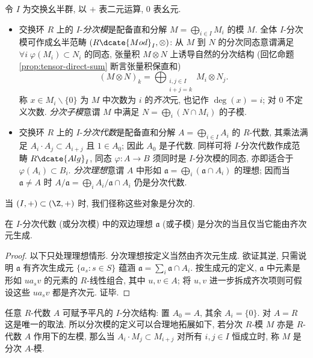 \begin{definition}[分次模与分次代数]\label{def:graded-module-alg}
	令 $I$ 为交换幺半群, 以 $+$ 表二元运算, $0$ 表幺元.
	\begin{itemize}
		\item 交换环 $R$ 上的 $I$-\emph{分次模}是配备直和分解 $M = \bigoplus_{i \in I} M_i$ 的模 $M$. 全体 $I$-分次模可作成幺半范畴 $(R\dcate{Mod}_I, \otimes)$: 从 $M$ 到 $N$ 的分次同态意谓满足 $\forall i \; \varphi(M_i) \subset N_i$ 的同态, 张量积 $M \otimes N$ 上诱导自然的分次结构 (回忆命题 \ref{prop:tensor-direct-sum} 断言张量积保直和)
		\[ (M \otimes N)_k = \bigoplus_{\substack{i,j \in I \\ i+j=k}} M_i \otimes N_j. \]
		称 $x \in M_i \smallsetminus \{0\}$ 为 $M$ 中次数为 $i$ 的\emph{齐次}元, 也记作 $\deg(x)=i$; 对 $0$ 不定义次数. \emph{分次子模}意谓 $M$ 中满足 $N = \bigoplus_i (N \cap M_i)$ 的子模.
		\item 交换环 $R$ 上的 $I$-\emph{分次代数}是配备直和分解 $A = \bigoplus_{i \in I} A_i$ 的 $R$-代数, 其乘法满足 $A_i \cdot A_j \subset A_{i+j}$ 且 $1 \in A_0$; 因此 $A_0$ 是子代数. 同样可将 $I$-分次代数作成范畴 $R\dcate{Alg}_I$, 同态 $\varphi: A \to B$ 须同时是 $I$-分次模的同态, 亦即适合于 $\varphi(A_i) \subset B_i$. \emph{分次理想}意谓 $A$ 中形如 $\mathfrak{a} = \bigoplus _i (\mathfrak{a} \cap A_i)$ 的理想; 因而当 $\mathfrak{a} \neq A$ 时 $A/\mathfrak{a} = \bigoplus_i A_i/\mathfrak{a} \cap A_i$ 仍是分次代数.
	\end{itemize}
	当 $(I,+) \subset (\Z,+)$ 时, 我们径称这些对象是分次的.
\end{definition}

\begin{lemma}\label{prop:graded-ideal-submodule}
	在 $I$-分次代数 (或分次模) 中的双边理想 $\mathfrak{a}$ (或子模) 是分次的当且仅当它能由齐次元生成.
\end{lemma}
\begin{proof}
	以下只处理理想情形. 分次理想按定义当然由齐次元生成. 欲证其逆, 只需说明 $\mathfrak{a}$ 有齐次生成元 $\{a_s : s \in S \}$ 蕴涵 $\mathfrak{a} = \sum_i \mathfrak{a} \cap A_i$. 按生成元的定义, $\mathfrak{a}$ 中元素是形如 $u a_s v$ 的元素的 $R$-线性组合, 其中 $u,v \in A$; 将 $u, v$ 进一步拆成齐次项则可假设这些 $u a_s v$ 都是齐次元. 证毕.
\end{proof}

任意 $R$-代数 $A$ 可赋予平凡的 $I$-分次结构: 置 $A_0 = A$, 其余 $A_i = \{0\}$. 对 $A = R$ 这是唯一的取法. 所以分次模的定义可以合理地拓展如下, 若分次 $R$-模 $M$ 亦是 $R$-代数 $A$ 作用下的左模, 那么当 $A_i \cdot M_j \subset M_{i+j}$ 对所有 $i,j \in I$ 恒成立时, 称 $M$ 是分次 $A$-模.

